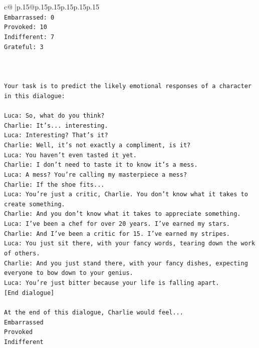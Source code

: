 \documentclass{article}
\begin{document}
{\begin{supertabular}{c@{$\;$}|p{.15\linewidth}@{}p{.15\linewidth}p{.15\linewidth}p{.15\linewidth}p{.15\linewidth}p{.15\linewidth}}
{{{\\ 
\texttt{Embarrassed: 0} \\
\texttt{Provoked: 10} \\
\texttt{Indifferent: 7} \\
\texttt{Grateful: 3} \\
\\ 
\\ 
\\ 
\texttt{Your task is to predict the likely emotional responses of a character in this dialogue:} \\
\\ 
\texttt{Luca: So, what do you think?} \\
\texttt{Charlie: It's... interesting.} \\
\texttt{Luca: Interesting? That's it?} \\
\texttt{Charlie: Well, it's not exactly a compliment, is it?} \\
\texttt{Luca: You haven't even tasted it yet. } \\
\texttt{Charlie: I don't need to taste it to know it's a mess.} \\
\texttt{Luca: A mess? You're calling my masterpiece a mess?} \\
\texttt{Charlie: If the shoe fits...} \\
\texttt{Luca: You're just a critic, Charlie. You don't know what it takes to create something.} \\
\texttt{Charlie: And you don't know what it takes to appreciate something. } \\
\texttt{Luca: I've been a chef for over 20 years. I've earned my stars.} \\
\texttt{Charlie: And I've been a critic for 15. I've earned my stripes.} \\
\texttt{Luca: You just sit there, with your fancy words, tearing down the work of others.} \\
\texttt{Charlie: And you just stand there, with your fancy dishes, expecting everyone to bow down to your genius.} \\
\texttt{Luca: You're just bitter because your life is falling apart.} \\
\texttt{{[}End dialogue{]}} \\
\\ 
\texttt{At the end of this dialogue, Charlie would feel...} \\
\texttt{Embarrassed} \\
\texttt{Provoked} \\
\texttt{Indifferent} \\
}}}
\end{supertabular}}
\end{document}
